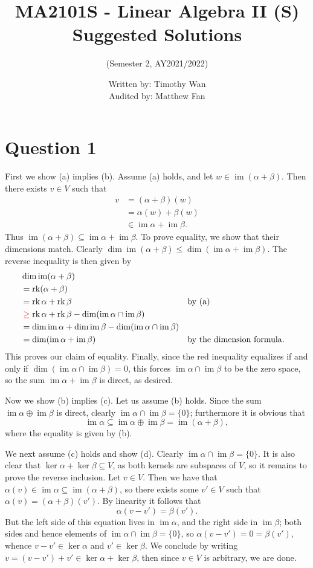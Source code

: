 \documentclass[12pt]{article}
\title{MA2101S - Linear Algebra II (S) Suggested Solutions}
\author{(Semester 2, AY2021/2022)}
\date{Written by: Timothy Wan\\Audited by: Matthew Fan}
\DeclareMathOperator{\im}{im}
\DeclareMathOperator{\rk}{rk}
\begin{document}
\maketitle

\section*{Question 1}
First we show (a) implies (b). Assume (a) holds, and let $w\in\im(\alpha+\beta)$.
Then there exists $v\in V$ such that
\begin{align*}
    v &= (\alpha+\beta)(w) \\&= \alpha(w) + \beta(w)\\&\in \im\alpha+\im\beta.
\end{align*}
Thus $\im(\alpha+\beta)\subseteq\im\alpha+\im\beta$. To prove equality, we
show that their dimensions match. Clearly
$\dim\im(\alpha+\beta)\leq\dim(\im\alpha+\im\beta)$. The reverse inequality is
then given by
\begin{alignat*}{2}
    &\dim\im(\alpha+\beta)
    \\&=\rk(\alpha+\beta)
    \\&=\rk\alpha+\rk\beta &&\text{by (a)}
    \\&\color{red}\geq\color{black}\rk\alpha+\rk\beta-\dim(\im\alpha\cap\im\beta)
    \\&=\dim\im\alpha+\dim\im\beta-\dim(\im\alpha\cap\im\beta)
    \\&=\dim(\im\alpha+\im\beta)
      &&\text{by the dimension formula.}
\end{alignat*}
This proves our claim of equality. Finally, since the red inequality equalizes
if and only if $\dim(\im\alpha\cap\im\beta)=0$, this forces
$\im\alpha\cap\im\beta$ to be the zero space, so the sum $\im\alpha+\im\beta$
is direct, as desired.

Now we show (b) implies (c). Let us assume (b) holds.
Since the sum $\im\alpha\oplus\im\beta$ is
direct, clearly $\im\alpha\cap\im\beta=\{0\}$; furthermore it is obvious that
\[
    \im\alpha\subseteq\im\alpha\oplus\im\beta=\im(\alpha+\beta),
\]
where the equality is given by (b).

We next assume (c) holds and show (d). Clearly $\im\alpha\cap\im\beta=\{0\}$.
It is also clear that $\ker\alpha+\ker\beta\subseteq V$, as both kernels are
subspaces of $V$, so it remains to prove the reverse inclusion. Let $v\in V$.
Then we have that
$\alpha(v)\in\im\alpha\subseteq\im(\alpha+\beta)$, so there exists some
$v'\in V$ such that $\alpha(v)=(\alpha+\beta)(v')$. By linearity it follows that
\[
    \alpha(v-v')=\beta(v').
\]
But the left side of this equation lives in $\im\alpha$, and the right side in
$\im\beta$; both sides and hence elements of $\im\alpha\cap\im\beta=\{0\}$, so
$\alpha(v-v')=0=\beta(v')$, whence $v-v'\in\ker\alpha$ and $v'\in\ker\beta$.
We conclude by writing $v=(v-v')+v'\in\ker\alpha+\ker\beta$, then since $v\in V$
is arbitrary, we are done.
\end{document}
